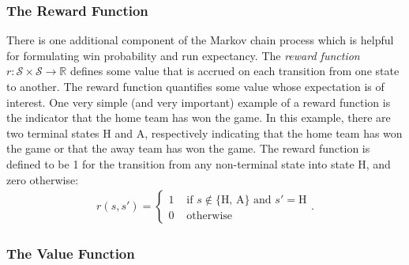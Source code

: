 \documentclass{article}
\begin{document}
    \subsubsection{\sc The Reward Function}

      There is one additional component of the Markov chain process which is helpful for formulating win probability and run expectancy. The {\it reward function} $r : \mathcal S \times \mathcal S \rightarrow \mathbb{R}$ defines some value that is accrued on each transition from one state to another. The reward function quantifies some value whose expectation is of interest. One very simple (and very important) example of a reward function is the indicator that the home team has won the game. In this example, there are two terminal states H and A, respectively indicating that the home team has won the game or that the away team has won the game. The reward function is defined to be 1 for the transition from any non-terminal state into state H, and zero otherwise:
      \begin{align}
        \label{eqn:reward-home-win}
        r(s, s') = \begin{cases}
          1 & \mbox{ if } s \notin \{\mbox{H, A}\} \mbox{ and } s' = \mbox{H}\\
          0 & \mbox{ otherwise}
        \end{cases}.
      \end{align}

    \subsubsection{\sc The Value Function}
\end{document}
